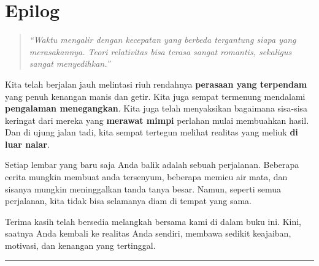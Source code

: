 \documentclass[11pt, openany, a5paper]{memoir}
\newcommand{\jedacerita}{%
  \fancybreak{\vspace{0.8em}\textasteriskcentered\quad\textasteriskcentered\quad\textasteriskcentered\vspace{0.8em}}%
}
\begin{document}
\chapter*{Epilog}
\begin{quotation}
  \textit{``Waktu mengalir dengan kecepatan yang berbeda tergantung siapa yang merasakannya. Teori relativitas bisa terasa sangat romantis, sekaligus sangat menyedihkan.''}
\end{quotation}
Kita telah berjalan jauh melintasi riuh rendahnya \textbf{perasaan yang terpendam} yang penuh kenangan manis dan getir. Kita juga sempat termenung mendalami \textbf{pengalaman menegangkan}. Kita juga telah menyaksikan bagaimana sisa-sisa keringat dari mereka yang \textbf{merawat mimpi} perlahan mulai membuahkan hasil. Dan di ujung jalan tadi, kita sempat tertegun melihat realitas yang meliuk \textbf{di luar nalar}.


Setiap lembar yang baru saja Anda balik adalah sebuah perjalanan. Beberapa cerita mungkin membuat anda tersenyum, beberapa memicu air mata, dan sisanya mungkin meninggalkan tanda tanya besar. Namun, seperti semua perjalanan, kita tidak bisa selamanya diam di tempat yang sama.


Terima kasih telah bersedia melangkah bersama kami di dalam buku ini. Kini, saatnya Anda kembali ke realitas Anda sendiri, membawa sedikit keajaiban, motivasi, dan kenangan yang tertinggal.
\jedacerita

\backmatter %

% 
\end{document}
